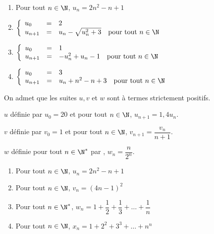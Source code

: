 \documentclass[a4paper,11pt,exos]{nsi} %
\begin{document}
\begin{multicols}{2}
	\begin{enumerate}
		\item 	Pour tout $n\in\N$, $u_n=2n^2-n+1$
		\item 	$\left\{
		\begin{array}{llll}
			u_0 & = & 2 &\\ 
			u_{n+1} & = & u_n-\sqrt{u_n^2+3} & \text{pour tout}\ n\in\N\\
		\end{array}\right. $\\
	
		\columnbreak
		\item 	$\left\{
		\begin{array}{llll}
			u_0 & = & 1 &\\ 
			u_{n+1} & = & -u_n^2+u_n-1 &\text{pour tout}\ n\in\N\\
		\end{array}\right. $
		\item 	$\left\{
		\begin{array}{llll}
			u_0 & = & 3 &\\ 
			u_{n+1} & = & u_n+n^2-n+3&\text{pour tout}\  n\in\N\\
		\end{array}\right. $
	\end{enumerate}
\end{multicols}

On admet que les suites $u,v$ et $w$ sont à termes strictement positifs.
\begin{enumalph}
	\item 	$u$ définie par $u_0=20$ et pour tout $n\in\N$, $u_{n+1}=1,4u_n$.
	\item 	$v$ définie par $v_0=1$ et pour tout $n\in\N$, $v_{n+1}=\dfrac{v_n}{n+1}$.
	\item 	$w$ définie pour tout $n\in\N^*$ par , $w_{n}=\dfrac{n}{2^n}$.
\end{enumalph}

\exo{}
\begin{multicols}{2}
	\begin{enumerate}
		\item 	Pour tout $n\in\N$, $u_n=2n^2-n+1$
		\item 	Pour tout $n\in\N$, $v_n=(4n-1)^2$
		\item 	Pour tout $n\in\N^*$, $w_n=1+\dfrac{1}{2}+\dfrac{1}{3}+\ldots+\dfrac{1}{n}$
		\item 	Pour tout $n\in\N$, $x_n=1+2^2+3^3+\ldots+n^n$
	\end{enumerate}
	
\end{multicols}
\end{document}
